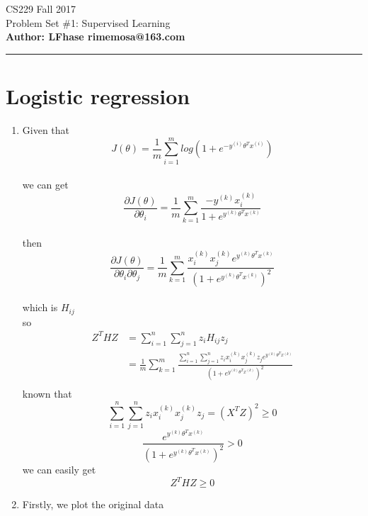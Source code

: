 \documentclass[12pt]{article}
\begin{document}
    \begin{flushleft}
    \LARGE CS229 Fall 2017\\
    \LARGE Problem Set \#1: Supervised Learning\\
    \textbf{\normalsize Author: LFhase \quad rimemosa@163.com}
    \end{flushleft} 
    \noindent
    \rule{\linewidth}{0.4pt}


    \section*{Logistic regression  }

    \begin{enumerate}[label=(\alph*)]

    \item 
    {
        Given that 
        $$J(\theta)= \frac{1}{m} \sum_{i=1}^{m}log(1+e^{-y^{(i)}\theta^{T}x^{(i)}})$$\\
        we can get
        $$\frac{\partial J(\theta)}{\partial \theta_{i}}
            =  \frac{1}{m} \sum_{k=1}^{m} \frac{-y^{(k)}x^{(k)}_i}{1+e^{y^{(k)}\theta^{T}x^{(k)}}}
        $$\\
        then
        $$\frac{\partial J(\theta)}{\partial \theta_{i} \partial \theta_{j}}
            =  \frac{1}{m} \sum_{k=1}^{m} 
            \frac{x^{(k)}_ix^{(k)}_je^{y^{(k)}\theta^{T}x^{(k)}}}
            {(1+e^{y^{(k)}\theta^{T}x^{(k)}})^2}
        $$\\
        which is $ H_{ij} $\\
        so
        \begin{equation*} 
        \begin{split}
            Z^THZ &= \sum_{i=1}^n \sum_{j=1}^n z_iH_{ij}z_j \\
            &= \frac{1}{m} \sum_{k=1}^{m} 
            \frac{\sum_{i=1}^n \sum_{j=1}^n z_ix^{(k)}_ix^{(k)}_jz_je^{y^{(k)}\theta^{T}x^{(k)}}}{(1+e^{y^{(k)}\theta^{T}x^{(k)}})^2}
            \\
        \end{split}
        \end{equation*} 
        known that 
        $$ \sum_{i=1}^n \sum_{j=1}^n z_ix^{(k)}_ix^{(k)}_jz_j = (X^TZ)^2 \geq 0 $$
        $$ \frac{e^{y^{(k)}\theta^{T}x^{(k)}}}{(1+e^{y^{(k)}\theta^{T}x^{(k)}})^2} > 0 $$
        we can easily get $$ Z^THZ \geq 0 $$
    }
    \newpage
    \item 
    {
        Firstly, we plot the original data

}
\end{enumerate}
\end{document}
